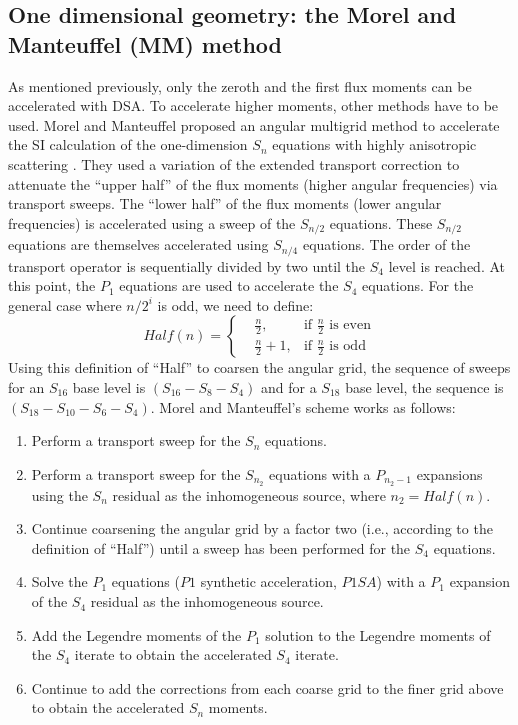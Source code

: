 \subsection{One dimensional geometry: the Morel and Manteuffel (MM) method}
As mentioned previously, only the zeroth and the first flux moments can be
accelerated with DSA. To accelerate higher moments, other methods have to be
used. Morel and Manteuffel proposed an angular multigrid method to accelerate
the SI calculation of the one-dimension $S_n$ equations with highly
anisotropic scattering \cite{multigrid_1d}. They used a variation of the
extended transport correction \cite{lathrop} to attenuate the ``upper half''
of the flux moments (higher angular frequencies) via transport sweeps. The
``lower half'' of the flux moments (lower angular frequencies) is accelerated
using a sweep of the $S_{n/2}$ equations. These $S_{n/2}$ equations are 
themselves accelerated using $S_{n/4}$ equations. The order of the transport 
operator is sequentially divided by two until the $S_4$ level is reached. At 
this point, the $P_1$ equations are used to accelerate the $S_4$ equations. For 
the general case where $n/2^i$ is odd, we need to define:
\begin{equation}
Half(n) = \left\{
\begin{aligned}
&\frac{n}{2}, &\textrm{if }\frac{n}{2}\textrm{ is even}\\
&\frac{n}{2}+1, &\textrm{if }\frac{n}{2}\textrm{ is odd}
\end{aligned}
\right. 
\end{equation}
Using this definition of ``Half'' to coarsen the angular grid, the sequence of
sweeps for an $S_{16}$ base level is $(S_{16}-S_8-S_4)$ and for a $S_{18}$
base level, the sequence is $(S_{18}-S_{10}-S_6-S_4)$. Morel and Manteuffel's
scheme works as follows:
\begin{enumerate}
\item Perform a transport sweep for the $S_n$ equations.
\item Perform a transport sweep for the $S_{n_2}$ equations with a $P_{n_2-1}$
expansions using the $S_n$ residual as the inhomogeneous source, where
$n_2=Half(n)$.
\item Continue coarsening the angular grid by a factor two (i.e., according to
the definition of ``Half'') until a sweep has been performed for the $S_4$
equations.
\item Solve the $P_1$ equations ($P1$ synthetic acceleration, $P1SA$) with a
$P_1$ expansion of the $S_4$ residual as the inhomogeneous source.
\item Add the Legendre moments of the $P_1$ solution to the Legendre moments
of the $S_4$ iterate to obtain the accelerated $S_4$ iterate.
\item Continue to add the corrections from each coarse grid to the finer grid
above to obtain the accelerated $S_n$ moments.
\end{enumerate}
